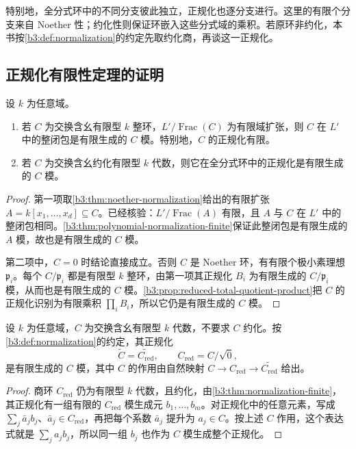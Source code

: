 特别地，全分式环中的不同分支彼此独立，正规化也逐分支进行。这里的有限个分支来自 Noether 性；约化性则保证环嵌入这些分式域的乘积。若原环非约化，本书按\cref{b3:def:normalization}的约定先取约化商，再谈这一正规化。

\subsection{正规化有限性定理的证明}
\label{b3:subsec:0605:05}

\begin{theorem}\label{b3:thm:normalization-finite}
	设 \(k\) 为任意域。
	\begin{enumerate}
		\item 若 \(C\) 为交换含幺有限型 \(k\) 整环，\(L'/\operatorname{Frac}(C)\) 为有限域扩张，则 \(C\) 在 \(L'\) 中的整闭包是有限生成的 \(C\) 模。特别地，\(C\) 的正规化有限。
		\item 若 \(C\) 为交换含幺约化有限型 \(k\) 代数，则它在全分式环中的正规化是有限生成的 \(C\) 模。
	\end{enumerate}
\end{theorem}
\begin{proof}
	第一项取\cref{b3:thm:noether-normalization}给出的有限扩张 \(A=k[x_1,\ldots,x_d]\subseteq C\)。已经核验：\(L'/\operatorname{Frac}(A)\) 有限，且 \(A\) 与 \(C\) 在 \(L'\) 中的整闭包相同。\cref{b3:thm:polynomial-normalization-finite}保证此整闭包是有限生成的 \(A\) 模，故也是有限生成的 \(C\) 模。

	第二项中，\(C=0\) 时结论直接成立。否则 \(C\) 是 Noether 环，有有限个极小素理想 \(\mathfrak p_i\)。每个 \(C/\mathfrak p_i\) 都是有限型 \(k\) 整环，由第一项其正规化 \(B_i\) 为有限生成的 \(C/\mathfrak p_i\) 模，从而也是有限生成的 \(C\) 模。\cref{b3:prop:reduced-total-quotient-product}把 \(C\) 的正规化识别为有限乘积 \(\prod_iB_i\)，所以它仍是有限生成的 \(C\) 模。
\end{proof}

\begin{corollary}\label{b3:cor:normalization-finite-arbitrary-algebra}
	设 \(k\) 为任意域，\(C\) 为交换含幺有限型 \(k\) 代数，不要求 \(C\) 约化。按\cref{b3:def:normalization}的约定，其正规化
	\[
		\widetilde C=\widetilde{C_{\mathrm{red}}}, \qquad C_{\mathrm{red}}=C/\sqrt0,
	\]
	是有限生成的 \(C\) 模，其中 \(C\) 的作用由自然映射 \(C\to C_{\mathrm{red}}\to\widetilde{C_{\mathrm{red}}}\) 给出。
\end{corollary}
\begin{proof}
	商环 \(C_{\mathrm{red}}\) 仍为有限型 \(k\) 代数，且约化，由\cref{b3:thm:normalization-finite}，其正规化有一组有限的 \(C_{\mathrm{red}}\) 模生成元 \(b_1,\ldots,b_m\)。对正规化中的任意元素，写成 \(\sum_j\bar a_jb_j\)、\(\bar a_j\in C_{\mathrm{red}}\)，再把每个系数 \(\bar a_j\) 提升为 \(a_j\in C\)。按上述 \(C\) 作用，这个表达式就是 \(\sum_ja_jb_j\)，所以同一组 \(b_j\) 也作为 \(C\) 模生成整个正规化。
\end{proof}


